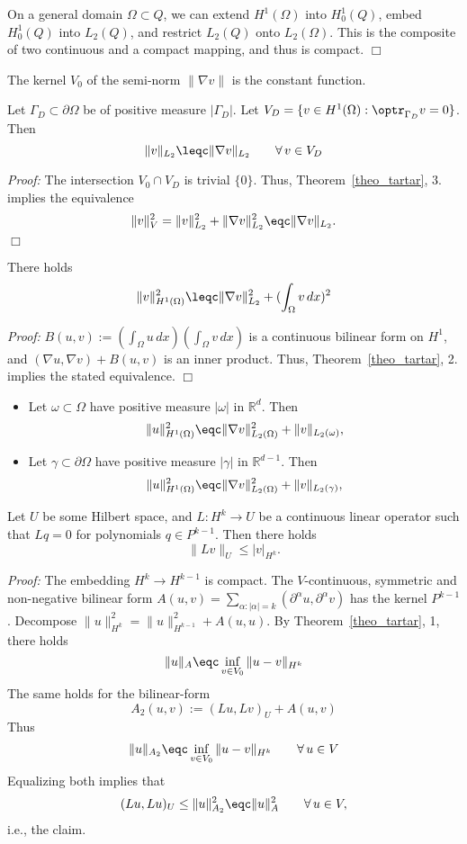 On a general domain $\Omega \subset Q$, we can extend $H^1(\Omega)$ 
into $H_0^1(Q)$, embed $H_0^1(Q)$ into $L_2(Q)$, and restrict $L_2(Q)$
onto $L_2(\Omega)$. This is the composite of two continuous and a compact
mapping, and thus is compact.
\hfill $\Box$

\bigskip
\noindent

The kernel $V_0$ of the semi-norm $\| \nabla v \|$ is the constant function.

\begin{theorem} 
Let $\Gamma_D \subset \partial \Omega$ be of positive measure $|\Gamma_D|$.
Let $V_D = \{ v \in H^1(\Omega) : \optr_{\Gamma_D} v = 0 \}$. Then
$$
\| v \|_{L_2} \leqc \| \nabla v \|_{L_2} \qquad \forall \, v \in V_D
$$
\end{theorem}
{\em Proof:} The intersection $V_0 \cap V_D$ is trivial $\{ 0 \}$. 
Thus, Theorem~\ref{theo_tartar}, 3. implies the equivalence  
$$
\| v \|_V^2 = \| v \|_{L_2}^2 + \| \nabla v \|_{L_2}^2 \eqc
\| \nabla v \|_{L_2}.
$$
\hfill $\Box$


\begin{theorem} 
There holds
$$
\| v \|_{H^1(\Omega)}^2 \leqc \| \nabla v \|_{L_2}^2 + (\int_\Omega v \, dx)^2
$$
\end{theorem}
{\em Proof:} $B(u,v) := (\int_\Omega u \, dx) (\int_\Omega v \, dx)$ is
a continuous bilinear form on $H^1$, and $(\nabla u, \nabla v) + B(u,v)$ is
an inner product. Thus, Theorem~\ref{theo_tartar}, 2. implies the 
stated equivalence.
\hfill $\Box$

\begin{itemize}
\item
Let $\omega \subset \Omega$ have positive measure $| \omega|$ in ${\mathbb R}^d$.
Then
$$
\| u \|_{H^1(\Omega)}^2 \eqc
 \| \nabla v \|_{L_2(\Omega)}^2 + \| v \|_{L_2(\omega)},
$$
\item
Let $\gamma \subset \partial \Omega$ have positive measure $| \gamma|$ in ${\mathbb R}^{d-1}$. Then
$$
\| u \|_{H^1(\Omega)}^2 \eqc
\| \nabla v \|_{L_2(\Omega)}^2 + \| v \|_{L_2(\gamma)},
$$
\end{itemize}


\begin{theorem} \label{lemma_bh} 
Let $U$ be some Hilbert space, and
$L : H^k \rightarrow U$ be a continuous linear operator such that 
$L q = 0$ for polynomials $q \in P^{k-1}$. Then there holds
$$
\| L v \|_U \leq | v |_{H^k}.
$$
\end{theorem}
{\em Proof:} The embedding $H^k \rightarrow H^{k-1}$ is compact. 
The $V$-continuous, symmetric and non-negative bilinear form
$A(u,v) = \sum_{\alpha : | \alpha | = k} (\partial^\alpha u, \partial^\alpha v)$ has the kernel $P^{k-1}$. Decompose $\| u \|_{H^k}^2 = \| u \|_{H^{k-1}}^2 + A(u,u)$. By Theorem~\ref{theo_tartar}, 1, there holds
$$
\| u \|_A \eqc \inf_{v \in V_0} \| u - v \|_{H^k}
$$
The same holds for the bilinear-form
$$
A_2(u,v) := (L u, Lv)_U + A(u,v)
$$
Thus
$$
\| u \|_{A_2} \eqc  \inf_{v \in V_0} \| u - v \|_{H^k} \qquad \forall \, u \in V
$$
Equalizing both  implies that
$$
(L u, Lu)_U \leq \| u \|_{A_2}^2 \eqc \| u \|_A^2  \qquad \forall \, u \in V,
$$
i.e., the claim.

